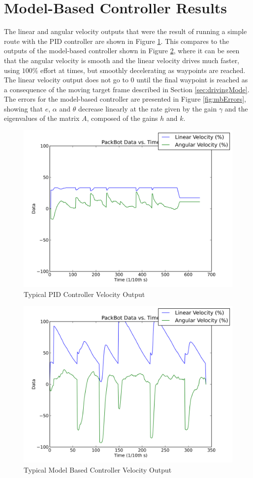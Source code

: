 \section{Model-Based Controller Results}
\label{sec:lyapunovResults}
The linear and angular velocity outputs that were the result of running a simple route with the PID controller are shown in Figure \ref{fig:pidOutput}. This compares to the outputs of the model-based controller shown in Figure \ref{fig:mbOutput}, where it can be seen that the angular velocity is smooth and the linear velocity drives much faster, using $100\%$ effort at times, but smoothly decelerating as waypoints are reached. The linear velocity output does not go to $0$ until the final waypoint is reached as a consequence of the moving target frame described in Section \ref{sec:drivingMode}. The errors for the model-based controller are presented in Figure \ref{fig:mbErrors}, showing that $e$, $\alpha$ and $\theta$ decrease linearly at the rate given by the gain $\gamma$ and the eigenvalues of the matrix $A$, composed of the gains $h$ and $k$.

\begin{figure}[ht!]
	\centering
	\includegraphics[width=.5\textwidth]{images/pbtx/20110109_1815_pbtx_simpleDrivePID}
	\caption{Typical PID Controller Velocity Output}
	\label{fig:pidOutput}
\end{figure}

\begin{figure}[ht!]
	\centering
	\includegraphics[width=.5\textwidth]{images/pbtx/20110113_1451_pbtx_simpleDrive}
	\caption{Typical Model Based Controller Velocity Output}
	\label{fig:mbOutput}
\end{figure}

